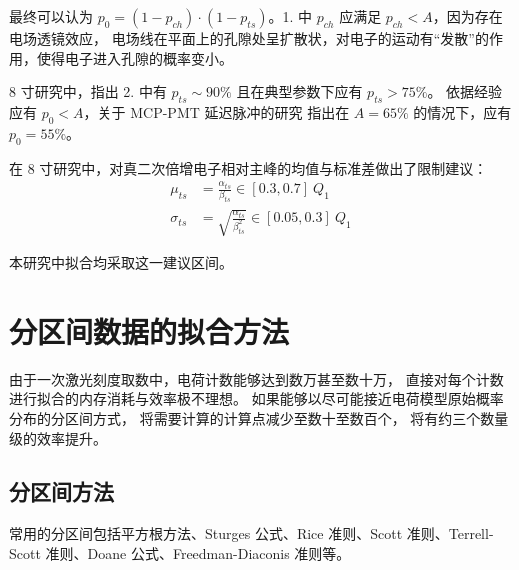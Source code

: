 最终可以认为 $p_0=(1-p_{ch})\cdot(1-p_{ts})$。1. 中 $p_{ch}$ 应满足 $p_{ch}<A$，因为存在电场透镜效应，
电场线在平面上的孔隙处呈扩散状，对电子的运动有“发散”的作用，使得电子进入孔隙的概率变小。

8 寸研究中，指出 2. 中有 $p_{ts}\sim90\%$ 且在典型参数下应有 $p_{ts}>75\%$。
依据经验应有 $p_0<A$，关于 MCP-PMT 延迟脉冲的研究\cite{chenPhotoelectronBackscatteringMicrochannel2018}
指出在 $A=65\%$ 的情况下，应有 $p_0=55\%$。

在 8 寸研究中，对真二次倍增电子相对主峰的均值与标准差做出了限制建议：
\begin{align}
    \mu_{ts}&=\frac{\alpha_{ts}}{\beta_{ts}}\in[0.3, 0.7]\ Q_1\\
    \sigma_{ts}&=\sqrt{\frac{\alpha_{ts}}{\beta_{ts}^2}}\in[0.05, 0.3]\ Q_1
\end{align}

本研究中拟合均采取这一建议区间。

\section{分区间数据的拟合方法}
由于一次激光刻度取数中，电荷计数能够达到数万甚至数十万，
直接对每个计数进行拟合的内存消耗与效率极不理想。
如果能够以尽可能接近电荷模型原始概率分布的分区间方式，
将需要计算的计算点减少至数十至数百个，
将有约三个数量级的效率提升。

\subsection{分区间方法}
常用的分区间包括平方根方法、Sturges 公式、Rice 准则、Scott 准则、Terrell-Scott 准则、Doane 公式、Freedman-Diaconis 准则等。

